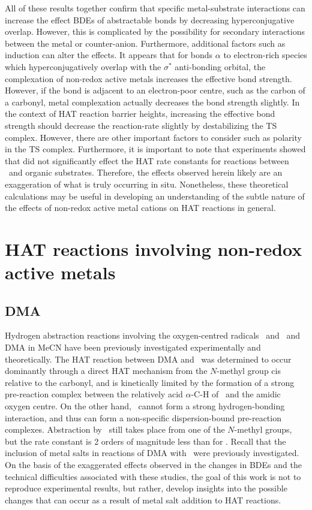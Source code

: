 All of these results together confirm that specific metal-substrate interactions can increase the effect BDEs of abstractable  bonds by decreasing hyperconjugative overlap. However, this is complicated by the possibility for secondary interactions between the metal or counter-anion. Furthermore, additional factors such as induction can alter the effects. It appears that for  bonds $\alpha$ to electron-rich species which hyperconjugatively overlap with the $\sigma^*$ anti-bonding orbital, the complexation of non-redox active metals increases the effective  bond strength. However, if the  bond is adjacent to an electron-poor centre, such as the carbon of a carbonyl, metal complexation actually decreases the bond strength slightly. In the context of HAT reaction barrier heights, increasing the effective  bond strength should decrease the reaction-rate slightly by destabilizing the TS complex. However, there are other important factors to consider such as polarity in the TS complex. Furthermore, it is important to note that experiments showed that  did not significantly effect the HAT rate constants for reactions between \cumo\ and organic substrates. Therefore, the effects observed herein likely are an exaggeration of what is truly occurring in situ. Nonetheless, these theoretical calculations may be useful in developing an understanding of the subtle nature of the effects of non-redox active metal cations on HAT reactions in general.

\section{HAT reactions involving non-redox active metals}

\subsection{DMA}

Hydrogen abstraction reactions involving the oxygen-centred radicals \bno\ and \cumo\ and DMA in MeCN have been previously investigated experimentally and theoretically.\cite{Salamone2013} The HAT reaction between DMA and \bno\ was determined to occur dominantly through a direct HAT mechanism from the $N$-methyl group cis relative to the carbonyl, and is kinetically limited by the formation of a strong pre-reaction complex between the relatively acid $\alpha$-C-H of \bno\ and the amidic oxygen centre. On the other hand, \cumo\ cannot form a strong hydrogen-bonding interaction, and thus can form a non-specific dispersion-bound pre-reaction complexes. Abstraction by \cumo\ still takes place from one of the $N$-methyl groups, but the rate constant is 2 orders of magnitude less than for \bno. Recall that the inclusion of metal salts in reactions of DMA with \cumo\ were previously investigated.\cite{Salamone2015metals} On the basis of the exaggerated effects observed in the changes in BDEs and the technical difficulties associated with these studies, the goal of this work is not to reproduce experimental results, but rather, develop insights into the possible changes that can occur as a result of metal salt addition to HAT reactions.

